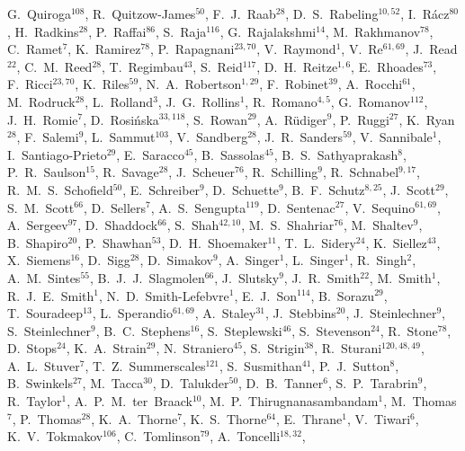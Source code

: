 \documentclass[12pt]{iopart}
\begin{document}
{G.~Quiroga$^{108}$, 
R.~Quitzow-James$^{50}$, 
F.~J.~Raab$^{28}$, 
D.~S.~Rabeling$^{10,52}$, 
I.~R\'acz$^{80}$, 
H.~Radkins$^{28}$, 
P.~Raffai$^{86}$, 
S.~Raja$^{116}$, 
G.~Rajalakshmi$^{14}$, 
M.~Rakhmanov$^{78}$, 
C.~Ramet$^{7}$, 
K.~Ramirez$^{78}$, 
P.~Rapagnani$^{23,70}$, 
V.~Raymond$^{1}$, 
V.~Re$^{61,69}$, 
J.~Read$^{22}$, 
C.~M.~Reed$^{28}$, 
T.~Regimbau$^{43}$, 
S.~Reid$^{117}$, 
D.~H.~Reitze$^{1,6}$, 
E.~Rhoades$^{73}$, 
F.~Ricci$^{23,70}$, 
K.~Riles$^{59}$, 
N.~A.~Robertson$^{1,29}$, 
F.~Robinet$^{39}$, 
A.~Rocchi$^{61}$, 
M.~Rodruck$^{28}$, 
L.~Rolland$^{3}$, 
J.~G.~Rollins$^{1}$, 
R.~Romano$^{4,5}$, 
G.~Romanov$^{112}$, 
J.~H.~Romie$^{7}$, 
D.~Rosi\'nska$^{33,118}$, 
S.~Rowan$^{29}$, 
A.~R\"udiger$^{9}$, 
P.~Ruggi$^{27}$, 
K.~Ryan$^{28}$, 
F.~Salemi$^{9}$, 
L.~Sammut$^{103}$, 
V.~Sandberg$^{28}$, 
J.~R.~Sanders$^{59}$, 
V.~Sannibale$^{1}$, 
I.~Santiago-Prieto$^{29}$, 
E.~Saracco$^{45}$, 
B.~Sassolas$^{45}$, 
B.~S.~Sathyaprakash$^{8}$, 
P.~R.~Saulson$^{15}$, 
R.~Savage$^{28}$, 
J.~Scheuer$^{76}$, 
R.~Schilling$^{9}$, 
R.~Schnabel$^{9,17}$, 
R.~M.~S.~Schofield$^{50}$, 
E.~Schreiber$^{9}$, 
D.~Schuette$^{9}$, 
B.~F.~Schutz$^{8,25}$, 
J.~Scott$^{29}$, 
S.~M.~Scott$^{66}$, 
D.~Sellers$^{7}$, 
A.~S.~Sengupta$^{119}$, 
D.~Sentenac$^{27}$, 
V.~Sequino$^{61,69}$, 
A.~Sergeev$^{97}$, 
D.~Shaddock$^{66}$, 
S.~Shah$^{42,10}$, 
M.~S.~Shahriar$^{76}$, 
M.~Shaltev$^{9}$, 
B.~Shapiro$^{20}$, 
P.~Shawhan$^{53}$, 
D.~H.~Shoemaker$^{11}$, 
T.~L.~Sidery$^{24}$, 
K.~Siellez$^{43}$, 
X.~Siemens$^{16}$, 
D.~Sigg$^{28}$, 
D.~Simakov$^{9}$, 
A.~Singer$^{1}$, 
L.~Singer$^{1}$, 
R.~Singh$^{2}$, 
A.~M.~Sintes$^{55}$, 
B.~J.~J.~Slagmolen$^{66}$, 
J.~Slutsky$^{9}$, 
J.~R.~Smith$^{22}$, 
M.~Smith$^{1}$, 
R.~J.~E.~Smith$^{1}$, 
N.~D.~Smith-Lefebvre$^{1}$, 
E.~J.~Son$^{114}$, 
B.~Sorazu$^{29}$, 
T.~Souradeep$^{13}$, 
L.~Sperandio$^{61,69}$, 
A.~Staley$^{31}$, 
J.~Stebbins$^{20}$, 
J.~Steinlechner$^{9}$, 
S.~Steinlechner$^{9}$, 
B.~C.~Stephens$^{16}$, 
S.~Steplewski$^{46}$, 
S.~Stevenson$^{24}$, 
R.~Stone$^{78}$, 
D.~Stops$^{24}$, 
K.~A.~Strain$^{29}$, 
N.~Straniero$^{45}$, 
S.~Strigin$^{38}$, 
R.~Sturani$^{120,48,49}$, 
A.~L.~Stuver$^{7}$, 
T.~Z.~Summerscales$^{121}$, 
S.~Susmithan$^{41}$, 
P.~J.~Sutton$^{8}$, 
B.~Swinkels$^{27}$, 
M.~Tacca$^{30}$, 
D.~Talukder$^{50}$, 
D.~B.~Tanner$^{6}$, 
S.~P.~Tarabrin$^{9}$, 
R.~Taylor$^{1}$, 
A.~P.~M.~ter~Braack$^{10}$, 
M.~P.~Thirugnanasambandam$^{1}$, 
M.~Thomas$^{7}$, 
P.~Thomas$^{28}$, 
K.~A.~Thorne$^{7}$, 
K.~S.~Thorne$^{64}$, 
E.~Thrane$^{1}$, 
V.~Tiwari$^{6}$, 
K.~V.~Tokmakov$^{106}$, 
C.~Tomlinson$^{79}$, 
A.~Toncelli$^{18,32}$, 
}
\end{document}
